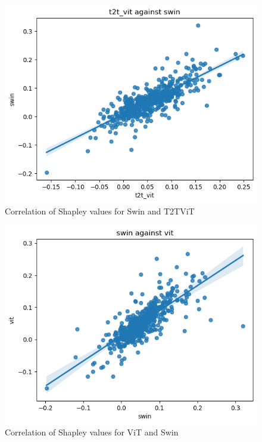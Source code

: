 \documentclass[en]{pracamgr}
\begin{document}
\begin{figure}[H]
\centering
\includegraphics[scale=0.5]{./images/shap_swin_t2t_vit.png}
\caption{Correlation of Shapley values for Swin and T2T\textunderscore ViT}
\label{shap_swin_t2t_vit}
\end{figure}

\begin{figure}[H]
\centering
\includegraphics[scale=0.5]{./images/shap_vit_swin.png}
\caption{Correlation of Shapley values for ViT and Swin}
\label{shap_vit_swin}
\end{figure}
\end{document}
